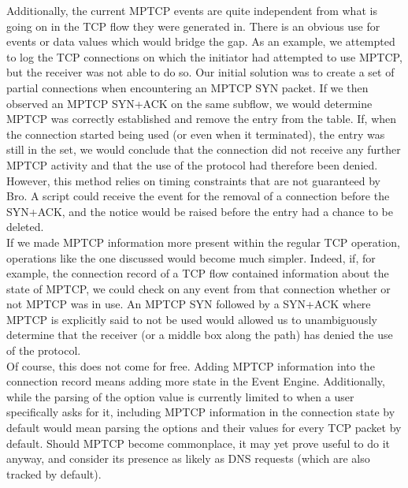 Additionally, the current MPTCP events are quite independent from what is going on in the TCP flow they were generated in. There is an obvious use for events or data values which would bridge the gap. As an example, we attempted to log the TCP connections on which the initiator had attempted to use MPTCP, but the receiver was not able to do so. Our initial solution was to create a set of partial connections when encountering an MPTCP SYN packet. If we then observed an MPTCP SYN+ACK on the same subflow, we would determine MPTCP was correctly established and remove the entry from the table. If, when the connection started being used (or even when it terminated), the entry was still in the set, we would conclude that the connection did not receive any further MPTCP activity and that the use of the protocol had therefore been denied. However, this method relies on timing constraints that are not guaranteed by Bro. A script could receive the event for the removal of a connection before the SYN+ACK, and the notice would be raised before the entry had a chance to be deleted. \\

If we made MPTCP information more present within the regular TCP operation, operations like the one discussed would become much simpler. Indeed, if, for example, the connection record of a TCP flow contained information about the state of MPTCP, we could check on any event from that connection whether or not MPTCP was in use. An MPTCP SYN followed by a SYN+ACK where MPTCP is explicitly said to not be used would allowed us to unambiguously determine that the receiver (or a middle box along the path) has denied the use of the protocol. \\

Of course, this does not come for free. Adding MPTCP information into the connection record means adding more state in the Event Engine. Additionally, while the parsing of the option value is currently limited to when a user specifically asks for it, including MPTCP information in the connection state by default would mean parsing the options and their values for every TCP packet by default. Should MPTCP become commonplace, it may yet prove useful to do it anyway, and consider its presence as likely as DNS requests (which are also tracked by default).

